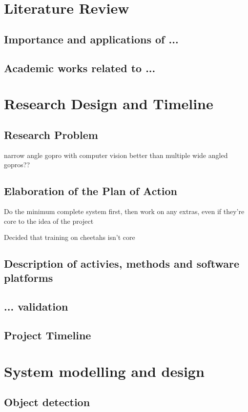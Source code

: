 \documentclass{article}
\begin{document}
\section{Literature Review}
\subsection{Importance and applications of ...}
\subsection{Academic works related to ...}

\section{Research Design and Timeline}
\subsection{Research Problem}
narrow angle gopro with computer vision better than multiple wide angled gopros??
\subsection{Elaboration of the Plan of Action}
Do the minimum complete system first, then work on any extras, even if they're core to the idea of the project

Decided that training on cheetahs isn't core

\subsection{Description of activies, methods and software platforms}
\subsection{... validation}
\subsection{Project Timeline}

\section{System modelling and design}

\subsection{Object detection}
\end{document}
